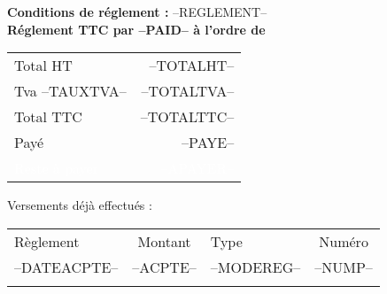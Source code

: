 \documentclass[a4paper, oneside, 10pt, french]{article}
\newcommand{\vhline}{\arrayrulecolor{chaumeil-violet}\hline\arrayrulecolor{black}}
\newcommand{\ghline}{\arrayrulecolor{gray}\hline\arrayrulecolor{black}}
\begin{document}
\begin{minipage}[t]{0.48\textwidth}
{\footnotesize \textbf{Conditions de réglement :} --REGLEMENT--}\\
\textbf{{\footnotesize Réglement TTC par --PAID-- à l'ordre de} }
\end{minipage}
\hspace{2mm}
\begin{minipage}[t]{0.50\textwidth}
\begin{flushright}
\begin{tabular}{p{4.5cm} r}
Total HT & --TOTALHT-- \\ 
Tva --TAUXTVA-- & --TOTALTVA-- \\
\vhline
Total TTC & --TOTALTTC--\\ 
Payé & --PAYE--\\ 
\rowcolor{chaumeil-violet}\textcolor{white}{Reste à payer} &\textcolor{white}{--APAYER--} \\ 
\end{tabular} 
\end{flushright}
\begin{flushright}
\begin{footnotesize}
Versements déjà effectués :
 \begin{tabular}{p{1.8cm} c p{1.8cm} c}
Règlement & Montant & Type & Numéro \\ 
\ghline 
 --DATEACPTE--& --ACPTE-- & --MODEREG-- & --NUMP-- \\ 
\ghline 
\end{tabular}
 \end{footnotesize} 
\end{flushright}
\end{minipage}

\newpage
\end{document}
